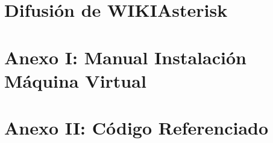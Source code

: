 \documentclass[a4paper,11pt]{book}
\begin{document}
\chapter{Difusión de WIKIAsterisk}\label{cap:difusion}


\chapter{Anexo I: Manual Instalación Máquina Virtual}


\chapter{Anexo II: Código Referenciado}




\nocite{atdg11}
\nocite{website:voipinfo}
\nocite{website:asterisk}
\nocite{win09}
\nocite{cookbook11}
\nocite{website:curl}
\nocite{website:telefonica}


\end{document}
